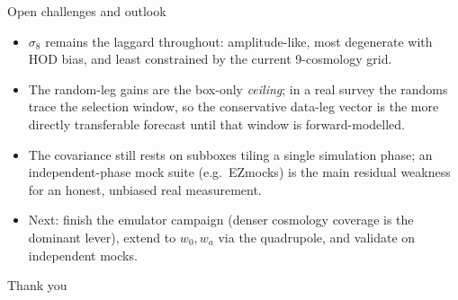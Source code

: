 \documentclass[aspectratio=169,11pt]{beamer}
\begin{document}
\begin{frame}{Open challenges and outlook}
\begin{itemize}
\item $\sigma_8$ remains the laggard throughout: amplitude-like, most
  degenerate with HOD bias, and least constrained by the current 9-cosmology
  grid.
\item The random-leg gains are the box-only \emph{ceiling}; in a real survey the
  randoms trace the selection window, so the conservative data-leg vector is
  the more directly transferable forecast until that window is
  forward-modelled.
\item The covariance still rests on subboxes tiling a single simulation phase;
  an independent-phase mock suite (e.g.\ EZmocks) is the main residual
  weakness for an honest, unbiased real measurement.
\item Next: finish the emulator campaign (denser cosmology coverage is the
  dominant lever), extend to $w_0,w_a$ via the quadrupole, and validate on
  independent mocks.
\end{itemize}
\vspace{10pt}
\centering
\Large Thank you
\end{frame}
\end{document}
